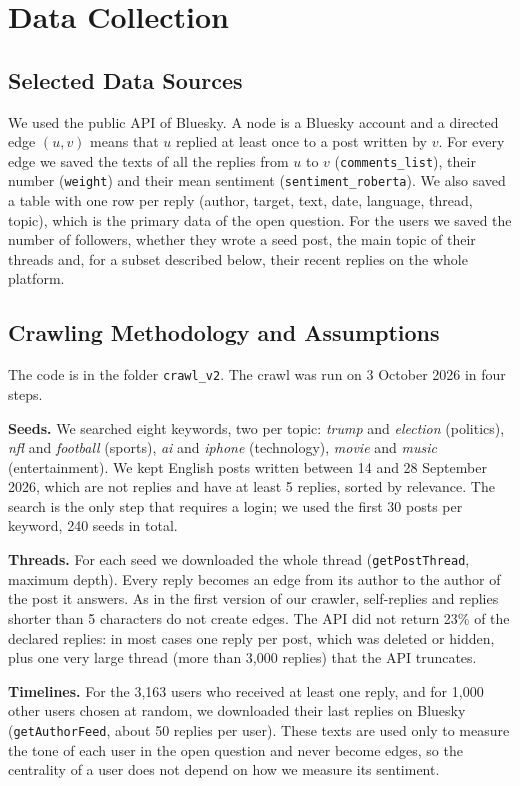 \documentclass[sigchi]{acmart}
\begin{document}
\section{Data Collection}\label{sec:data}

\subsection{Selected Data Sources}
We used the public API of Bluesky. A node is a Bluesky account and a directed edge $(u,v)$ means that $u$ replied at least once to a post written by $v$. For every edge we saved the texts of all the replies from $u$ to $v$ (\texttt{comments\_list}), their number (\texttt{weight}) and their mean sentiment (\texttt{sentiment\_roberta}). We also saved a table with one row per reply (author, target, text, date, language, thread, topic), which is the primary data of the open question. For the users we saved the number of followers, whether they wrote a seed post, the main topic of their threads and, for a subset described below, their recent replies on the whole platform.

\subsection{Crawling Methodology and Assumptions}
The code is in the folder \texttt{crawl\_v2}. The crawl was run on 3 October 2026 in four steps.

\textbf{Seeds.} We searched eight keywords, two per topic: \textit{trump} and \textit{election} (politics), \textit{nfl} and \textit{football} (sports), \textit{ai} and \textit{iphone} (technology), \textit{movie} and \textit{music} (entertainment). We kept English posts written between 14 and 28 September 2026, which are not replies and have at least 5 replies, sorted by relevance. The search is the only step that requires a login; we used the first 30 posts per keyword, 240 seeds in total.

\textbf{Threads.} For each seed we downloaded the whole thread (\texttt{getPostThread}, maximum depth). Every reply becomes an edge from its author to the author of the post it answers. As in the first version of our crawler, self-replies and replies shorter than 5 characters do not create edges. The API did not return 23\% of the declared replies: in most cases one reply per post, which was deleted or hidden, plus one very large thread (more than 3,000 replies) that the API truncates.

\textbf{Timelines.} For the 3,163 users who received at least one reply, and for 1,000 other users chosen at random, we downloaded their last replies on Bluesky (\texttt{getAuthorFeed}, about 50 replies per user). These texts are used only to measure the tone of each user in the open question and never become edges, so the centrality of a user does not depend on how we measure its sentiment.
\end{document}
